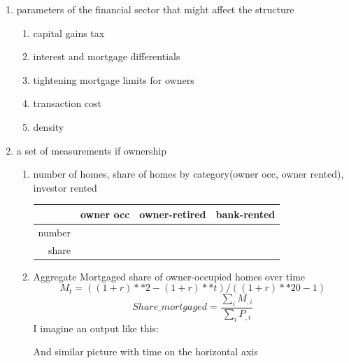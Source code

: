     \begin{enumerate}
    \item parameters of the financial sector  that might affect the structure
      \begin{enumerate}
        \item capital gains tax
        \item interest and mortgage differentials
        \item tightening mortgage limits for owners
        \item {\color{red}transaction cost}
        \item density
      \end{enumerate}
    \item a set of measurements if ownership
     \begin{enumerate}
        \item number of homes, share of homes by category(owner occ, owner rented), 
        investor rented
        
\begin{tabular}{|r|c|c|c|}\hline
            & owner occ& owner-retired & bank-rented\\ \hline
number      & && \\ \hline
share       & && \\\hline
\end{tabular}

    \item Aggregate Mortgaged share of owner-occupied homes over time 
\[M_t=((1+r)**2-(1+r)**t) / ((1+r)**20-1)\]
\[Share\_mortgaged =\frac{\sum_i M_{,i}}{\sum_iP_{,i}}\]     
I imagine an output like this:


And  similar picture with time on the horizontal axis

    \end{enumerate}
  
\end{enumerate}
 
